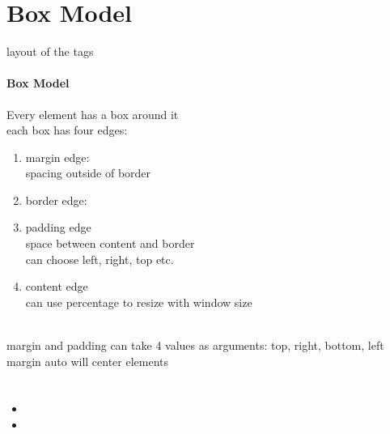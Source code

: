 \documentclass{article}
\begin{document}
\section{Box Model}
	layout of the tags
	\paragraph*{Box Model} Every element has a box around it
	\\each box has four edges:
	\begin{enumerate}
		\itemsep0em
		\item margin edge:
		\\ spacing outside of border
		\item border edge:
		\\
		\item padding edge
		\\ space between content and border
		\\ can choose left, right, top etc.
		\item content edge
		\\ can use percentage to resize with window size
	\end{enumerate}
	\\margin and padding can take 4 values as arguments: top, right, bottom, left
	\\margin auto will center elements
\section{}
\begin{itemize}
	\itemsep0em
	\item
	\item
\end{itemize}
\end{document}

